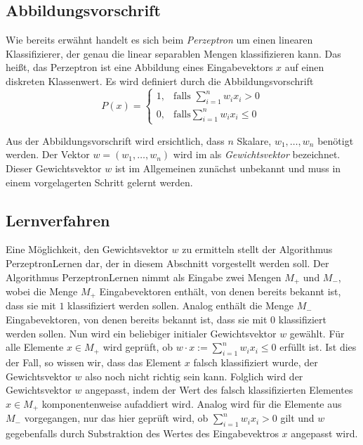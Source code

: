 \documentclass[fontsize=11pt]{scrartcl}
\begin{document}
            \subsection{Abbildungsvorschrift}
                Wie bereits erwähnt handelt es sich beim \emph{Perzeptron} um einen linearen Klassifizierer, der genau die linear separablen Mengen klassifizieren kann. Das heißt, das Perzeptron ist eine Abbildung eines Eingabevektors $x$ auf einen diskreten Klassenwert. Es wird definiert durch die Abbildungsvorschrift
                $$
            P(x)=\left\{\begin{array}{cl} 1, & \mbox{falls }\sum_{i=1}^nw_ix_i > 0\\ 0, & \mbox{falls} \sum_{i=1}^n w_ix_i \leq 0 \end{array}\right. 
                $$

                Aus der Abbildungsvorschrift wird ersichtlich, dass $n$ Skalare, $w_1,\dots,w_n$ benötigt werden. Der Vektor $w = (w_1,\dots, w_n)$ wird im als \emph{Gewichtsvektor} bezeichnet. Dieser Gewichtsvektor $w$ ist im Allgemeinen zunächst unbekannt und muss in einem vorgelagerten Schritt gelernt werden.
            \subsection{Lernverfahren}
                Eine Möglichkeit, den Gewichtsvektor $w$ zu ermitteln stellt der Algorithmus PerzeptronLernen dar, der in diesem Abschnitt vorgestellt werden soll. Der Algorithmus PerzeptronLernen nimmt als Eingabe zwei Mengen $M_+$ und $M_-$, wobei die Menge $M_+$ Eingabevektoren enthält, von denen bereits bekannt ist, dass sie mit $1$ klassifiziert werden sollen. Analog enthält die Menge $M_-$ Eingabevektoren, von denen bereits bekannt ist, dass sie mit $0$ klassifiziert werden sollen.
                \newline
                Nun wird ein beliebiger initialer Gewichtsvektor $w$ gewählt.
                \newline
                Für alle Elemente $x \in M_+$ wird geprüft, ob $w \cdot x := \sum_{i=1}^nw_ix_i \leq 0$ erfüllt ist. Ist dies der Fall, so wissen wir, dass das Element $x$ falsch klassifiziert wurde, der Gewichtsvektor $w$ also noch nicht richtig sein kann. Folglich wird der Gewichtsvektor $w$ angepasst, indem der Wert des falsch klassifizierten Elementes $x \in M_+$ komponentenweise aufaddiert wird.
                \newline
                Analog wird für die Elemente aus $M_-$ vorgegangen, nur das hier geprüft wird, ob $\sum_{i=1}^nw_ix_i > 0$ gilt und $w$ gegebenfalls durch Substraktion des Wertes des Eingabevektros $x$ angepasst wird.
\end{document}
